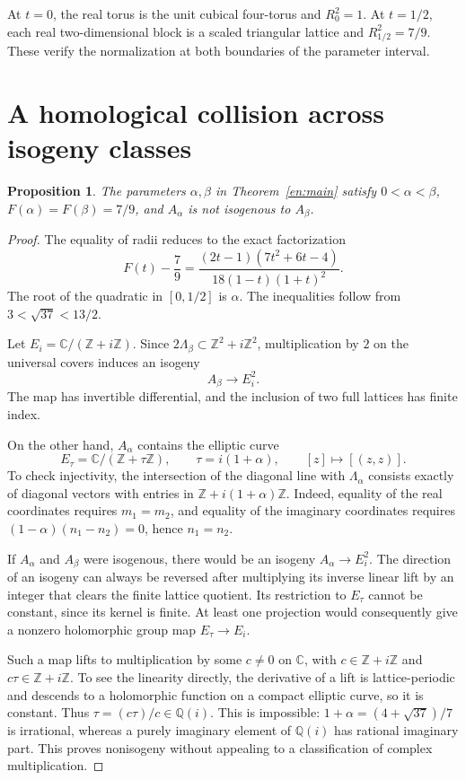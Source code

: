 \documentclass[12pt]{amsart}
\newcommand{\PropositionName}{Proposition}
\newtheorem{prop}[thm]{\PropositionName}
\theoremstyle{definition}
\theoremstyle{remark}
\numberwithin{equation}{section}
\newcommand{\Z}{\mathbb{Z}}
\newcommand{\C}{\mathbb{C}}
\newcommand{\Q}{\mathbb{Q}}
\begin{document}
At $t=0$, the real torus is the unit cubical four-torus and $R_0^2=1$. At $t=1/2$, each real two-dimensional block is a scaled triangular lattice and $R_{1/2}^2=7/9$. These verify the normalization at both boundaries of the parameter interval.

\section{A homological collision across isogeny classes}
\begin{prop}\label{en:collision}
The parameters $\alpha,\beta$ in Theorem~\ref{en:main} satisfy $0<\alpha<\beta$, $F(\alpha)=F(\beta)=7/9$, and $A_\alpha$ is not isogenous to $A_\beta$.
\end{prop}
\begin{proof}
The equality of radii reduces to the exact factorization
\begin{equation}\label{en:factor}
F(t)-\frac79
=\frac{(2t-1)(7t^2+6t-4)}{18(1-t)(1+t)^2}.
\end{equation}
The root of the quadratic in $[0,1/2]$ is $\alpha$. The inequalities follow from $3<\sqrt{37}<13/2$.

Let $E_i=\C/(\Z+i\Z)$. Since $2\Lambda_\beta\subset\Z^2+i\Z^2$, multiplication by $2$ on the universal covers induces an isogeny
\[
A_\beta\longrightarrow E_i^2.
\]
The map has invertible differential, and the inclusion of two full lattices has finite index.

On the other hand, $A_\alpha$ contains the elliptic curve
\[
E_\tau=\C/(\Z+\tau\Z),\qquad \tau=i(1+\alpha),
\qquad [z]\longmapsto[(z,z)].
\]
To check injectivity, the intersection of the diagonal line with $\Lambda_\alpha$ consists exactly of diagonal vectors with entries in $\Z+i(1+\alpha)\Z$. Indeed, equality of the real coordinates requires $m_1=m_2$, and equality of the imaginary coordinates requires
$(1-\alpha)(n_1-n_2)=0$, hence $n_1=n_2$.

If $A_\alpha$ and $A_\beta$ were isogenous, there would be an isogeny $A_\alpha\to E_i^2$. The direction of an isogeny can always be reversed after multiplying its inverse linear lift by an integer that clears the finite lattice quotient. Its restriction to $E_\tau$ cannot be constant, since its kernel is finite. At least one projection would consequently give a nonzero holomorphic group map $E_\tau\to E_i$.

Such a map lifts to multiplication by some $c\ne0$ on $\C$, with
$c\in\Z+i\Z$ and $c\tau\in\Z+i\Z$. To see the linearity directly, the derivative of a lift is lattice-periodic and descends to a holomorphic function on a compact elliptic curve, so it is constant. Thus $\tau=(c\tau)/c\in\Q(i)$. This is impossible: $1+\alpha=(4+\sqrt{37})/7$ is irrational, whereas a purely imaginary element of $\Q(i)$ has rational imaginary part. This proves nonisogeny without appealing to a classification of complex multiplication.
\end{proof}
\end{document}
